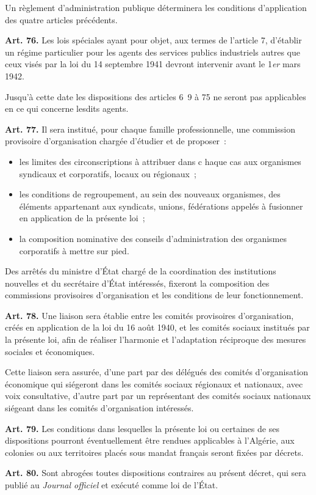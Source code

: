 \documentclass[french,twoside]{book} %
\newcommand{\labelchar}[1]{\textbf{\color{rubric} #1}}
\begin{document}
Un règlement d’administration publique déterminera les conditions d’application des quatre articles précédents.\par
\bigbreak
\noindent \labelchar{Art. 76.} Les lois spéciales ayant pour objet, aux termes de l’article 7, d’établir un régime particulier pour les agents des services publics industriels autres que ceux visés par la loi du 14 septembre 1941 devront intervenir avant le 1\emph{er} mars 1942.\par
Jusqu’à cette date les dispositions des articles 6 9 à 75 ne seront pas applicables en ce qui concerne lesdits agents.\par
\bigbreak
\noindent \labelchar{Art. 77.} Il sera institué, pour chaque famille professionnelle, une commission provisoire d’organisation chargée d’étudier et de proposer :\par

\begin{itemize}[itemsep=0pt,]
\item les limites des circonscriptions à attribuer dans c haque cas aux organismes syndicaux et corporatifs, locaux ou régionaux ;
\item les conditions de regroupement, au sein des nouveaux organismes, des éléments appartenant aux syndicats, unions, fédérations appelés à fusionner en application de la présente loi ;
\item la composition nominative des conseils d’administration des organismes corporatifs à mettre sur pied.
\end{itemize}
\noindent Des arrêtés du ministre d’État chargé de la coordination des institutions nouvelles et du secrétaire d’État intéressés, fixeront la composition des commissions provisoires d’organisation et les conditions de leur fonctionnement.\par
\bigbreak
\noindent \labelchar{Art. 78.} Une liaison sera établie entre les comités provisoires d’organisation, créés en application de la loi du 16 août 1940, et les comités sociaux institués par la présente loi, afin de réaliser l’harmonie et l’adaptation réciproque des mesures sociales et économiques.\par
Cette liaison sera assurée, d’une part par des délégués des comités d’organisation économique qui siégeront dans les comités sociaux régionaux et nationaux, avec voix consultative, d’autre part par un représentant des comités sociaux nationaux siégeant dans les comités d’organisation intéressés.\par
\bigbreak
\noindent \labelchar{Art. 79.} Les conditions dans lesquelles la présente loi ou certaines de ses dispositions pourront éventuellement être rendues applicables à l’Algérie, aux colonies ou aux territoires placés sous mandat français seront fixées par décrets.\par
\bigbreak
\noindent \labelchar{Art. 80.} Sont abrogées toutes dispositions contraires au présent décret, qui sera publié au \emph{Journal officiel} et exécuté comme loi de l’État.
\renewcommand{\leftmark}{Signatures}
\end{document}
